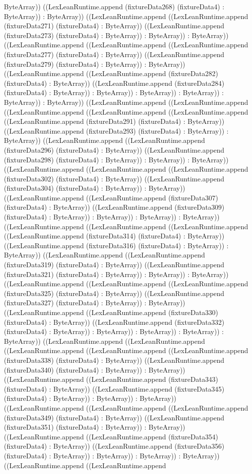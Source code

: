 \documentclass[11pt]{article}
\begin{document}
ByteArray)) ((LexLeanRuntime.append (fixtureData268) (fixtureData4) : ByteArray)) : ByteArray)) ((LexLeanRuntime.append ((LexLeanRuntime.append (fixtureData271) (fixtureData4) : ByteArray)) ((LexLeanRuntime.append (fixtureData273) (fixtureData4) : ByteArray)) : ByteArray)) : ByteArray)) ((LexLeanRuntime.append ((LexLeanRuntime.append ((LexLeanRuntime.append (fixtureData277) (fixtureData4) : ByteArray)) ((LexLeanRuntime.append (fixtureData279) (fixtureData4) : ByteArray)) : ByteArray)) ((LexLeanRuntime.append ((LexLeanRuntime.append (fixtureData282) (fixtureData4) : ByteArray)) ((LexLeanRuntime.append (fixtureData284) (fixtureData4) : ByteArray)) : ByteArray)) : ByteArray)) : ByteArray)) : ByteArray)) : ByteArray)) ((LexLeanRuntime.append ((LexLeanRuntime.append ((LexLeanRuntime.append ((LexLeanRuntime.append ((LexLeanRuntime.append ((LexLeanRuntime.append (fixtureData291) (fixtureData4) : ByteArray)) ((LexLeanRuntime.append (fixtureData293) (fixtureData4) : ByteArray)) : ByteArray)) ((LexLeanRuntime.append ((LexLeanRuntime.append (fixtureData296) (fixtureData4) : ByteArray)) ((LexLeanRuntime.append (fixtureData298) (fixtureData4) : ByteArray)) : ByteArray)) : ByteArray)) ((LexLeanRuntime.append ((LexLeanRuntime.append ((LexLeanRuntime.append (fixtureData302) (fixtureData4) : ByteArray)) ((LexLeanRuntime.append (fixtureData304) (fixtureData4) : ByteArray)) : ByteArray)) ((LexLeanRuntime.append ((LexLeanRuntime.append (fixtureData307) (fixtureData4) : ByteArray)) ((LexLeanRuntime.append (fixtureData309) (fixtureData4) : ByteArray)) : ByteArray)) : ByteArray)) : ByteArray)) ((LexLeanRuntime.append ((LexLeanRuntime.append ((LexLeanRuntime.append ((LexLeanRuntime.append (fixtureData314) (fixtureData4) : ByteArray)) ((LexLeanRuntime.append (fixtureData316) (fixtureData4) : ByteArray)) : ByteArray)) ((LexLeanRuntime.append ((LexLeanRuntime.append (fixtureData319) (fixtureData4) : ByteArray)) ((LexLeanRuntime.append (fixtureData321) (fixtureData4) : ByteArray)) : ByteArray)) : ByteArray)) ((LexLeanRuntime.append ((LexLeanRuntime.append ((LexLeanRuntime.append (fixtureData325) (fixtureData4) : ByteArray)) ((LexLeanRuntime.append (fixtureData327) (fixtureData4) : ByteArray)) : ByteArray)) ((LexLeanRuntime.append ((LexLeanRuntime.append (fixtureData330) (fixtureData4) : ByteArray)) ((LexLeanRuntime.append (fixtureData332) (fixtureData4) : ByteArray)) : ByteArray)) : ByteArray)) : ByteArray)) : ByteArray)) ((LexLeanRuntime.append ((LexLeanRuntime.append ((LexLeanRuntime.append ((LexLeanRuntime.append ((LexLeanRuntime.append (fixtureData338) (fixtureData4) : ByteArray)) ((LexLeanRuntime.append (fixtureData340) (fixtureData4) : ByteArray)) : ByteArray)) ((LexLeanRuntime.append ((LexLeanRuntime.append (fixtureData343) (fixtureData4) : ByteArray)) ((LexLeanRuntime.append (fixtureData345) (fixtureData4) : ByteArray)) : ByteArray)) : ByteArray)) ((LexLeanRuntime.append ((LexLeanRuntime.append ((LexLeanRuntime.append (fixtureData349) (fixtureData4) : ByteArray)) ((LexLeanRuntime.append (fixtureData351) (fixtureData4) : ByteArray)) : ByteArray)) ((LexLeanRuntime.append ((LexLeanRuntime.append (fixtureData354) (fixtureData4) : ByteArray)) ((LexLeanRuntime.append (fixtureData356) (fixtureData4) : ByteArray)) : ByteArray)) : ByteArray)) : ByteArray)) ((LexLeanRuntime.append ((LexLeanRuntime.append 
\end{document}
